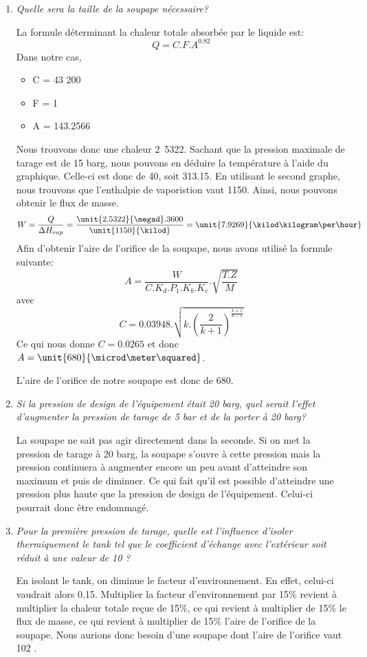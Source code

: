 \documentclass{report}
\begin{document}
\begin{enumerate}
\item\textit{Quelle sera la taille de la soupape nécessaire?}

La formule déterminant la chaleur totale absorbée par le liquide est: $$ Q = C.F.A^{0.82} $$
Dans notre cas,
\begin{itemize}
\item C = 43 200
\item F = 1
\item A = 143.2566 \meter\squared
\end{itemize}
Nous trouvons donc une chaleur \unit{2.5322}{\megad\watt}.
Sachant que la pression maximale de tarage est de 15 barg, nous pouvons en déduire la température à l'aide du graphique. Celle-ci est donc de 40\celsius, soit 313.15\kelvin. En utilisant le second graphe, nous trouvons que l'enthalpie de vaporistion vaut \unit{1150}{\kilo\joule\per\kilogram}. Ainsi, nous pouvons obtenir le flux de masse. $$ W = \frac{Q}{\Delta H_{vap}} = \frac{\unit{2.5322}{\megad}.3600}{\unit{1150}{\kilod}} = \unit{7.9269}{\kilod\kilogram\per\hour} $$
Afin d'obtenir l'aire de l'orifice de la soupape, nous avons utilisé la formule suivante:
$$ A = \frac{W}{C.K_d.P_1.K_b.K_c}.\sqrt{\frac{T.Z}{M}} $$ avec $$ C = 0.03948.\sqrt{k.(\frac{2}{k+1})^\frac{k+1}{k-1}} $$
Ce qui nous donne $ C = 0.0265$ et donc $A = \unit{680}{\microd\meter\squared}$.

L'aire de l'orifice de notre soupape est donc de \unit{680}{\microd\meter\squared}.

\item\textit{Si la pression de design de l'équipement était 20 barg, quel serait l'effet d'augmenter la pression de tarage de 5 bar et de la porter à 20 barg?}

La soupape ne sait pas agir directement dans la seconde. Si on met la pression de tarage à 20 barg, la soupape s'ouvre à cette pression mais la pression continuera à augmenter encore un peu avant d'atteindre son maximum et puis de diminuer. Ce qui fait qu'il est possible d'atteindre une pression plus haute que la pression de design de l'équipement. Celui-ci pourrait donc être endommagé.

\item\textit{Pour la première pression de tarage, quelle est l'influence d'isoler thermiquement le tank tel que le coefficient d'échange avec l'extérieur soit réduit à une valeur de 10 \watt\per\meter\squared\kelvin ?}

En isolant le tank, on diminue le facteur d'environnement. En effet, celui-ci vaudrait alors 0.15. Multiplier la facteur d'environnement par 15\% revient à multiplier la chaleur totale reçue de 15\%, ce qui revient à multiplier de 15\% le flux de masse, ce qui revient à multiplier de 15\% l'aire de l'orifice de la soupape. Nous aurions donc besoin d'une soupape dont l'aire de l'orifice vaut 102 \microd\meter\squared.
\end{enumerate}
\end{document}
